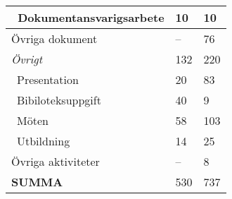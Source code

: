 \documentclass[10pt,oneside,swedish]{lips}
\begin{document}
\begin{tabular}{|l|l|l|}
  \ Dokumentansvarigsarbete   &          10 &          10 \\\hline
Övriga dokument             &           -- &          76 \\\hline
\emph{Övrigt}                      &         132 &           220 \\\hline
  \ Presentation              &          20 &          83 \\\hline
  \ Bibiloteksuppgift         &          40 &           9 \\\hline
  \ Möten                     &          58 &         103 \\\hline
  \ Utbildning                &          14 &          25 \\\hline
Övriga aktiviteter          &           -- &           8 \\\hline
\textbf{SUMMA}                       &         530 &         737 \\\hline
	
	
\end{tabular}
\end{document}
